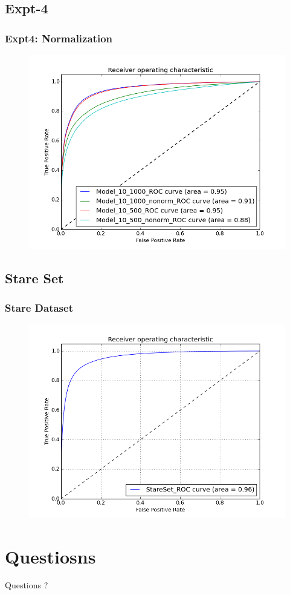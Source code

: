 \documentclass{beamer}
\begin{document}
\subsection{Expt-4}
\begin{frame}
\frametitle{Expt4: Normalization}
\begin{figure}
\includegraphics[width=0.8\linewidth]{Images/expt4.png}
\end{figure}
\end{frame}
\subsection{Stare Set}
\begin{frame}
\frametitle{Stare Dataset}
\begin{figure}
\includegraphics[width=0.8\linewidth]{Images/stare.png}
\end{figure}
\end{frame}

\section{Questiosns}
\begin{frame}
\Huge{\centerline{Questions ?}}
\end{frame}

\end{document}
